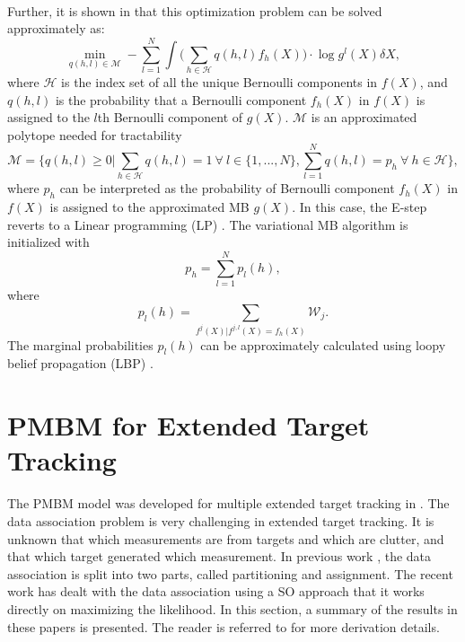 ~\\
Further, it is shown in \cite{variational} that this optimization problem can be solved approximately as:
\begin{equation}
    \min\limits_{q(h,l)\in\mathcal{M}}-\sum^N_{l=1}\int \Bigg(\sum_{h\in\mathcal{H}}q(h,l)f_{h}(X)\Bigg)\cdot\log g^l(X)\delta X,
    \label{eq:qhj}
\end{equation}
where $\mathcal{H}$ is the index set of all the unique Bernoulli components in $f(X)$, and $q(h,l)$ is the probability that a Bernoulli component $f_h(X)$ in $f(X)$ is assigned to the $l$th Bernoulli component of $g(X)$. $\mathcal{M}$ is an approximated polytope needed for tractability
\begin{equation}
    \mathcal{M} = \Bigg\{q(h,l)\geq0\Bigg|\sum_{h\in\mathcal{H}}q(h,l)=1 ~\forall~ l\in\{1,...,N\},\sum^N_{l=1}q(h,l)=p_h ~\forall~ h\in\mathcal{H}\Bigg\},
    \label{eq:polytope}
\end{equation}
where $p_h$ can be interpreted as the probability of Bernoulli component $f_h(X)$ in $f(X)$ is assigned to the approximated MB $g(X)$. In this case, the E-step reverts to a Linear programming (LP) \cite{variational}. The variational MB algorithm is initialized with
\begin{equation}
    p_h = \sum_{l=1}^N p_l(h),
\end{equation}
where
\begin{equation}
p_l(h) = \sum\limits_{f^j(X)|f^{j,l}(X)=f_h(X)}\mathcal{W}_j.
\label{eq:marginalprob}
\end{equation}
The marginal probabilities $p_l(h)$ can be approximately calculated using loopy belief propagation (LBP) \cite{lbp}.

\section{PMBM for Extended Target Tracking}
The PMBM model was developed for multiple extended target tracking in \cite{pmbmextended,pmbmextended2,soextended}. The data association problem is very challenging in extended target tracking. It is unknown that which measurements are from targets and which are clutter, and that which target generated which measurement. In previous work \cite{pmbmextended,pmbmextended2}, the data association is split into two parts, called partitioning and assignment. The recent work \cite{soextended} has dealt with the data association using a SO approach that it works directly on maximizing the likelihood. In this section, a summary of the results in these papers is presented. The reader is referred to \cite{pmbmextended,pmbmextended2,soextended} for more derivation details.  

